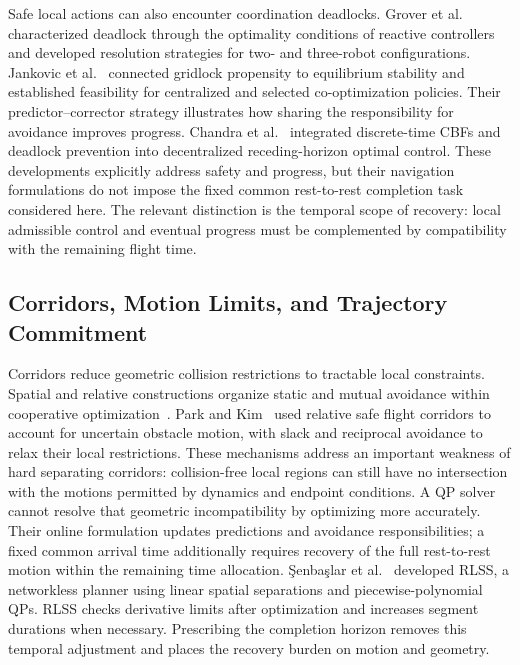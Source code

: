 Safe local actions can also encounter coordination deadlocks. Grover et al.~\cite{grover2023} characterized deadlock through the optimality conditions of reactive controllers and developed resolution strategies for two- and three-robot configurations. Jankovic et al.~\cite{jankovic2024} connected gridlock propensity to equilibrium stability and established feasibility for centralized and selected co-optimization policies. Their predictor--corrector strategy illustrates how sharing the responsibility for avoidance improves progress. Chandra et al.~\cite{chandra2025} integrated discrete-time CBFs and deadlock prevention into decentralized receding-horizon optimal control. These developments explicitly address safety and progress, but their navigation formulations do not impose the fixed common rest-to-rest completion task considered here. The relevant distinction is the temporal scope of recovery: local admissible control and eventual progress must be complemented by compatibility with the remaining flight time.

\subsection{Corridors, Motion Limits, and Trajectory Commitment}
Corridors reduce geometric collision restrictions to tractable local constraints. Spatial and relative constructions organize static and mutual avoidance within cooperative optimization~\cite{bu2025}. Park and Kim~\cite{park2021} used relative safe flight corridors to account for uncertain obstacle motion, with slack and reciprocal avoidance to relax their local restrictions. These mechanisms address an important weakness of hard separating corridors: collision-free local regions can still have no intersection with the motions permitted by dynamics and endpoint conditions. A QP solver cannot resolve that geometric incompatibility by optimizing more accurately. Their online formulation updates predictions and avoidance responsibilities; a fixed common arrival time additionally requires recovery of the full rest-to-rest motion within the remaining time allocation. \c{S}enba\c{s}lar et al.~\cite{senbaslar2023} developed RLSS, a networkless planner using linear spatial separations and piecewise-polynomial QPs. RLSS checks derivative limits after optimization and increases segment durations when necessary. Prescribing the completion horizon removes this temporal adjustment and places the recovery burden on motion and geometry.

